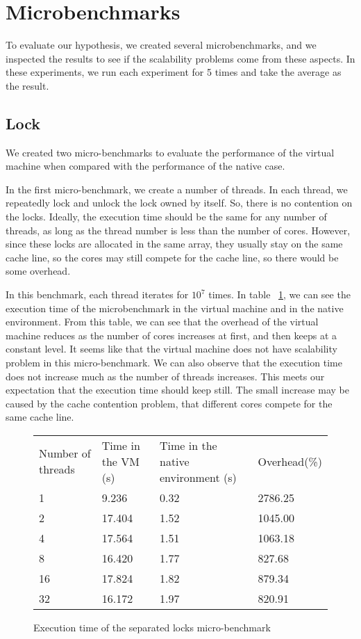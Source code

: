 \section{Microbenchmarks}
To evaluate our hypothesis, we created several microbenchmarks, and we inspected
the results to see if the scalability problems come from these aspects.
In these experiments, we run each experiment for 5 times and take the average
as the result.

\subsection{Lock}
We created two micro-benchmarks to evaluate the performance of the virtual
machine when compared with the performance of the native case.

In the first micro-benchmark, we create a number of threads. In each thread, 
we repeatedly lock and unlock the lock owned by itself. So, there is no 
contention on the locks. Ideally, the execution time should be the same for any 
number of threads, as long as the thread number is less than the number of 
cores.  However, since these locks are allocated in the same array, they usually
stay on the same cache line, so the cores may still compete for the cache line,
so there would be some overhead.

In this benchmark, each thread iterates for $10^7$ times.
In table ~\ref{fig:sep_mutex}, we can see the execution time of the
microbenchmark in the virtual machine and in the native environment.
From this table, we can see that the overhead of the virtual machine reduces as
the number of cores increases at first, and then keeps at a constant level.
It seems like that the virtual machine does not have scalability problem in
this micro-benchmark.
We can also observe that the execution time does not increase much as the
number of threads increases. This meets our expectation that the execution
time should keep still. The small increase may be caused by the cache
contention problem, that different cores compete for the same cache line.

\begin{figure}[here]
\begin{tabular}{  l | l | l | l  }
	Number of threads & Time in the VM (s) & Time in the native environment (s) & Overhead(\%) \\
	1 & 9.236 & 0.32 & 2786.25 \\ 
	2 & 17.404 & 1.52 & 1045.00 \\
	4 & 17.564 & 1.51 & 1063.18 \\
	8 & 16.420 & 1.77 & 827.68 \\
	16 & 17.824 & 1.82 & 879.34 \\
	32 & 16.172 & 1.97 & 820.91 \\
\end{tabular}
\caption{Execution time of the separated locks micro-benchmark}
\label{fig:sep_mutex}
\end{figure}

